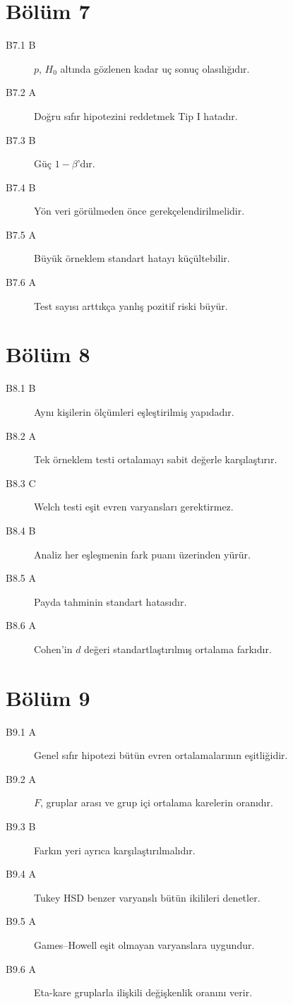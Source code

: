 \section*{Bölüm 7}
\begin{description}
\item[B7.1 B] $p$, $H_0$ altında gözlenen kadar uç sonuç olasılığıdır.
\item[B7.2 A] Doğru sıfır hipotezini reddetmek Tip I hatadır.
\item[B7.3 B] Güç $1-\beta$'dır.
\item[B7.4 B] Yön veri görülmeden önce gerekçelendirilmelidir.
\item[B7.5 A] Büyük örneklem standart hatayı küçültebilir.
\item[B7.6 A] Test sayısı arttıkça yanlış pozitif riski büyür.
\end{description}

\section*{Bölüm 8}
\begin{description}
\item[B8.1 B] Aynı kişilerin ölçümleri eşleştirilmiş yapıdadır.
\item[B8.2 A] Tek örneklem testi ortalamayı sabit değerle karşılaştırır.
\item[B8.3 C] Welch testi eşit evren varyansları gerektirmez.
\item[B8.4 B] Analiz her eşleşmenin fark puanı üzerinden yürür.
\item[B8.5 A] Payda tahminin standart hatasıdır.
\item[B8.6 A] Cohen'in $d$ değeri standartlaştırılmış ortalama farkıdır.
\end{description}

\section*{Bölüm 9}
\begin{description}
\item[B9.1 A] Genel sıfır hipotezi bütün evren ortalamalarının eşitliğidir.
\item[B9.2 A] $F$, gruplar arası ve grup içi ortalama karelerin oranıdır.
\item[B9.3 B] Farkın yeri ayrıca karşılaştırılmalıdır.
\item[B9.4 A] Tukey HSD benzer varyanslı bütün ikilileri denetler.
\item[B9.5 A] Games--Howell eşit olmayan varyanslara uygundur.
\item[B9.6 A] Eta-kare gruplarla ilişkili değişkenlik oranını verir.
\end{description}

